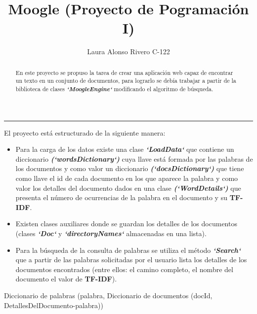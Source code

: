 \documentclass{article}
\begin{document}
\title{ \textbf{Moogle} (Proyecto de Pogramación I)}
\author{ Laura Alonso Rivero C-122}
\date{}
\maketitle
\rule{1.0\textwidth}{0.1mm}

\begin{abstract}
   En este proyecto se propuso la tarea de crear una aplicación web capaz de encontrar un 
texto en un conjunto de documentos, para lograrlo se debía trabajar a partir de la biblioteca de clases \textbf{\textit{`MoogleEngine`}} modificando el algoritmo de búsqueda.
\end{abstract}

\large{El proyecto está estructurado de la siguiente manera:}
\begin{itemize}
    \item \large{ Para la carga de los datos existe una clase \textbf{\textit{`LoadData`}} que contiene un diccionario \textbf{\textit{(`wordsDictionary`)}} cuya llave está formada por las palabras de los documentos y como valor un diccionario  \textbf{\textit{(`docsDictionary`)}} que tiene como llave el id de cada  documento en los que aparece la palabra y como valor los detalles del documento dados en una clase  \textbf{\textit{(`WordDetails`)}} que presenta el número de ocurrencias de la palabra en el documento y su \textbf{TF-IDF}.}

    \item \large{ Existen clases auxiliares donde se guardan los detalles de los documentos 
(clases \textbf{\textit{`Doc`}} y \textbf{\textit{`directoryNames`}} almacenadas en una lista).}

    \item \large{Para la búsqueda de la consulta de palabras se utiliza el método \textbf{\textit{`Search`}} que a partir de las palabras solicitadas por el usuario lista los detalles de los documentos encontrados (entre ellos: el camino completo, el nombre del documento el valor de \textbf{TF-IDF}).}\linebreak \\
\end{itemize}

\large{Diccionario de palabras (palabra,
\newline\hspace*{5.5cm}Diccionario de documentos (docId,
\newline\hspace*{11cm}DetallesDelDocumento-palabra))}\linebreak \\
\end{document}
